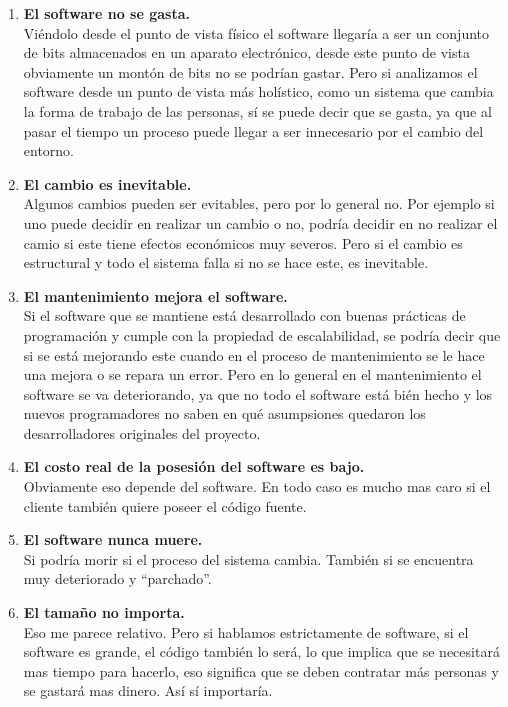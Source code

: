 \begin{enumerate}
  \item \textbf{El software no se gasta.} \\
    Viéndolo desde el punto de vista físico el software llegaría a ser un conjunto de bits almacenados en un aparato electrónico, desde este punto de vista obviamente un montón de bits no se podrían gastar. Pero si analizamos el software desde un punto de vista más holístico, como un sistema que cambia la forma de trabajo de las personas, sí se puede decir que se gasta, ya que al pasar el tiempo un proceso puede llegar a ser innecesario por el cambio del entorno.
  \item \textbf{El cambio es inevitable.} \\
    Algunos cambios pueden ser evitables, pero por lo general no. Por ejemplo si uno puede decidir en realizar un cambio o no, podría decidir en no realizar el camio si este tiene efectos económicos muy severos. Pero si el cambio es estructural y todo el sistema falla si no se hace este, es inevitable.
  \item \textbf{El mantenimiento mejora el software.} \\
    Si el software que se mantiene está desarrollado con buenas prácticas de programación y cumple con la propiedad de escalabilidad, se podría decir que si se está mejorando este cuando en el proceso de mantenimiento se le hace una mejora o se repara un error. Pero en lo general en el mantenimiento el software se va deteriorando, ya que no todo el software está bién hecho y los nuevos programadores no saben en qué asumpsiones quedaron los desarrolladores originales del proyecto.
  \item \textbf{El costo real de la posesión del software es bajo.} \\
    Obviamente eso depende del software. En todo caso es mucho mas caro si el cliente también quiere poseer el código fuente.
  \item \textbf{El software nunca muere.} \\
    Si podría morir si el proceso del sistema cambia. También si se encuentra muy deteriorado y ``parchado''.
  \item \textbf{El tamaño no importa.} \\
    Eso me parece relativo. Pero si hablamos estrictamente de software, si el software es grande, el código también lo será, lo que implica que se necesitará mas tiempo para hacerlo, eso significa que se deben contratar más personas y se gastará mas dinero. Así sí importaría.
\end{enumerate}